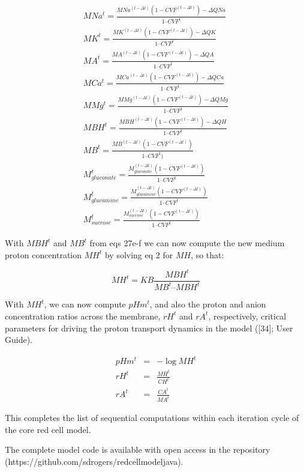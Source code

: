 \documentclass[a4paper]{article}
\newcommand{\med}[1]{M#1}
\newcommand{\cell}[1]{C#1}
\newcommand{\MA}{\med{A}}
\newcommand{\MB}{\med{B}}
\newcommand{\MBH}{\med{BH}}
\newcommand{\MGluca}{M_{glucamine}}
\newcommand{\MNa}{\med{Na}}
\newcommand{\MK}{\med{K}}
\newcommand{\MGluco}{M_{gluconate}}
\newcommand{\MH}{\med{H}}
\newcommand{\MCa}{\med{Ca}}
\newcommand{\MMg}{\med{Mg}}
\newcommand{\MSuc}{M_{sucrose}}
\newcommand{\CH}{\cell{H}}
\newcommand{\CA}{\cell{A}}
\begin{document}
\begin{eqnarray}
\MNa^t = \frac{\MNa^{(t-\Delta t)}(1-CVF^{(t-\Delta t)}) - \Delta QNa}{1 – CVF^t }\\
\MK^t = \frac{\MK^{(t-\Delta t)}(1-CVF^{(t-\Delta t)}) - \Delta QK}{1 – CVF^t }\\
\MA^t = \frac{\MA^{(t-\Delta t)}(1-CVF^{(t-\Delta t)}) - \Delta QA}{1 – CVF^t }\\
\MCa^t = \frac{\MCa^{(t-\Delta t)}(1-CVF^{(t-\Delta t)}) - \Delta QCa}{1 – CVF^t }\\
\MMg^t = \frac{\MMg^{(t-\Delta t)}(1-CVF^{(t-\Delta t)}) - \Delta QMg}{1 – CVF^t }\\
\MBH^t = \frac{\MBH^{(t-\Delta t)}(1-CVF^{(t-\Delta t)}) - \Delta QH}{1 – CVF^t }\\
\MB^t = \frac{\MB^{(t-\Delta t)}(1-CVF^{(t-\Delta t)})}{1 – CVF^t) }\\
\MGluco^t = \frac{\MGluco^{(t-\Delta t)}(1-CVF^{(t-\Delta t)})}{1 – CVF^t }\\
\MGluca^t = \frac{\MGluca^{(t-\Delta t)}(1-CVF^{(t-\Delta t)})}{1 – CVF^t }\\
\MSuc^t = \frac{\MSuc^{(t-\Delta t)}(1-CVF^{(t-\Delta t)})}{1 – CVF^t} 
\end{eqnarray}

With $MBH^t$ and $MB^t$ from eqs 27e-f we can now compute the new medium proton concentration $MH^t$ by solving eq 2 for $MH$, so that:

\setcounter{equation}{0}
\renewcommand{\theequation}{28\alph{equation}}

\begin{equation}
\MH^t = KB\frac{\MBH^t}{\MB^t – \MBH^t}
\end{equation}

With $MH^t$, we can now compute $pHm^t$, and also the proton and anion concentration ratios across the membrane, $rH^t$ and $rA^t$, respectively, critical parameters for driving the proton transport dynamics in the model ([34]; User Guide).

\begin{eqnarray}
pHm^t&=& -\log\MH^t\\
rH^t &=&\frac{\MH^t}{\CH^t} \\
rA^t &=& \frac{\CA^t}{\MA^t} 
\end{eqnarray}

This completes the list of sequential computations within each iteration cycle of the core red cell model.    

The complete model code is available with open access in the repository (https://github.com/sdrogers/redcellmodeljava).   
\end{document}
